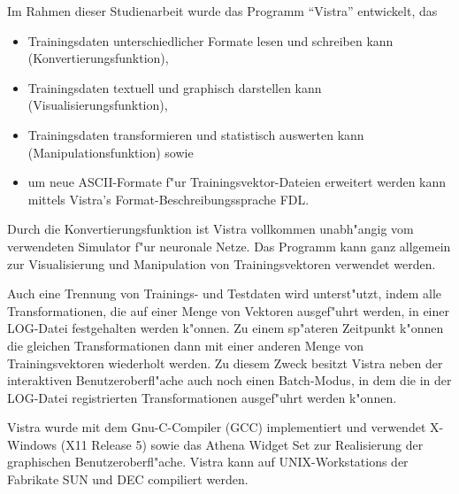 Im Rahmen dieser Studienarbeit wurde das Programm "`Vistra"' entwickelt, das
\begin{itemize}
\item Trainingsdaten unterschiedlicher Formate lesen und schreiben
kann (Konvertierungsfunktion),
\item Trainingsdaten textuell und graphisch darstellen kann
(Visualisierungsfunktion),
\item Trainingsdaten transformieren und statistisch
auswerten kann (Manipulationsfunktion) sowie
\item um neue ASCII-Formate f"ur Trainingsvektor-Dateien erweitert werden 
kann mittels Vistra's Format-Beschreibungssprache FDL.
\end{itemize}
Durch die Konvertierungsfunktion ist Vistra vollkommen unabh"angig 
vom verwendeten Simulator f"ur neuronale Netze. 
Das Programm kann ganz allgemein zur Visualisierung und Manipulation von
Trainingsvektoren verwendet werden.

Auch eine Trennung von Trainings- und Testdaten wird unterst"utzt,
indem alle Transformationen, die auf einer Menge von Vektoren
ausgef"uhrt werden, in einer LOG-Datei festgehalten werden k"onnen.
Zu einem sp"ateren Zeitpunkt k"onnen die gleichen Transformationen 
dann mit einer anderen Menge von Trainingsvektoren wiederholt werden.
Zu diesem Zweck besitzt Vistra neben der interaktiven Benutzeroberfl"ache
auch noch einen Batch-Modus, in dem die in der LOG-Datei registrierten
Transformationen ausgef"uhrt werden k"onnen. 

Vistra wurde mit dem Gnu-C-Compiler (GCC) implementiert und verwendet
X-Windows (X11 Release 5) sowie das Athena Widget Set zur Realisierung
der graphischen Benutzer\-oberfl"ache. 
Vistra kann auf UNIX-Workstations der Fabrikate SUN und DEC compiliert
werden.
